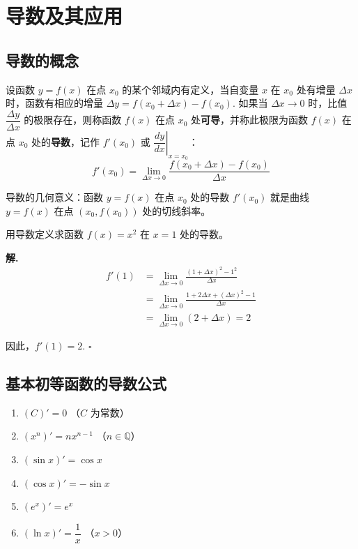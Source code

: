 \chapter{导数及其应用}

\section{导数的概念}

\begin{definition}[导数]
设函数 $y = f(x)$ 在点 $x_0$ 的某个邻域内有定义，当自变量 $x$ 在 $x_0$ 处有增量 $\Delta x$ 时，函数有相应的增量 $\Delta y = f(x_0 + \Delta x) - f(x_0)$. 如果当 $\Delta x \to 0$ 时，比值 $\dfrac{\Delta y}{\Delta x}$ 的极限存在，则称函数 $f(x)$ 在点 $x_0$ 处\textbf{可导}，并称此极限为函数 $f(x)$ 在点 $x_0$ 处的\textbf{导数}，记作 $f'(x_0)$ 或 $\left.\dfrac{dy}{dx}\right|_{x=x_0}$：
\[ f'(x_0) = \lim_{\Delta x \to 0} \frac{f(x_0 + \Delta x) - f(x_0)}{\Delta x} \]
\end{definition}

\begin{note}
导数的几何意义：函数 $y = f(x)$ 在点 $x_0$ 处的导数 $f'(x_0)$ 就是曲线 $y = f(x)$ 在点 $(x_0, f(x_0))$ 处的切线斜率。
\end{note}

\begin{example}
用导数定义求函数 $f(x) = x^2$ 在 $x = 1$ 处的导数。
\end{example}

\textbf{解.}
\begin{align*}
f'(1) &= \lim_{\Delta x \to 0} \frac{(1 + \Delta x)^2 - 1^2}{\Delta x} \\
&= \lim_{\Delta x \to 0} \frac{1 + 2\Delta x + (\Delta x)^2 - 1}{\Delta x} \\
&= \lim_{\Delta x \to 0} (2 + \Delta x) = 2
\end{align*}

因此，$f'(1) = 2$. \hfill $\square$

\section{基本初等函数的导数公式}

\begin{theorem}[基本求导公式]
\begin{enumerate}
    \item $(C)' = 0$ \quad （$C$ 为常数）
    \item $(x^n)' = nx^{n-1}$ \quad （$n \in \mathbb{Q}$）
    \item $(\sin x)' = \cos x$
    \item $(\cos x)' = -\sin x$
    \item $(e^x)' = e^x$
    \item $(\ln x)' = \dfrac{1}{x}$ \quad （$x > 0$）
\end{enumerate}
\end{theorem}

